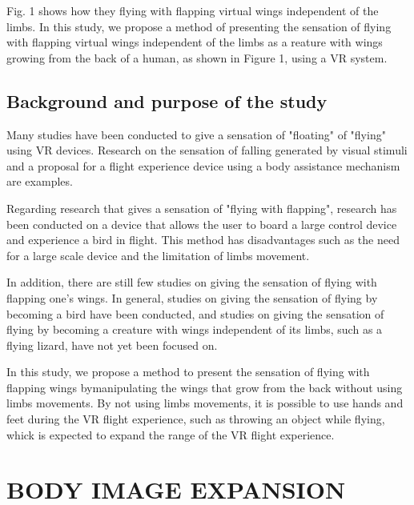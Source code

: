 \documentclass[letterpaper, 10 pt, conference]{ieeeconf}  %
\begin{document}
        Fig. 1 shows how they flying  with flapping virtual wings independent of the limbs.  
        In this study, we propose a method of presenting the sensation of flying with flapping virtual wings independent of the limbs as a reature with wings growing from the back of a human, as shown in Figure 1, using a VR system.  

        \subsection{Background and purpose of the study}
                
                Many studies have been conducted to give a sensation of "floating" of "flying" using VR devices.  
                Research on the sensation of falling generated by visual stimuli
                and a proposal for a flight experience device using a body assistance mechanism
                are examples.  

                Regarding research that gives a sensation of "flying with flapping", research has been conducted on a device that allows the user to board a large control device and experience a bird in flight.
                This method has  disadvantages such as the need for a large scale device and the limitation of limbs movement.  

                In addition, there are still few studies on giving the sensation of flying with flapping one's wings.  
                In general, studies on giving the sensation of flying by becoming a bird have been conducted, and studies on giving the sensation of flying by becoming a creature with wings independent of its limbs, such as a flying lizard, have not yet been focused on.

                In this study, we propose a method to present the sensation of flying with flapping wings bymanipulating the wings that grow from the back without using limbs movements.
                By not using limbs movements, it is possible to use hands and feet during the VR flight experience, such as throwing an object while flying, whick is expected to expand the range of the VR flight experience.

\section{BODY IMAGE EXPANSION}
\end{document}
